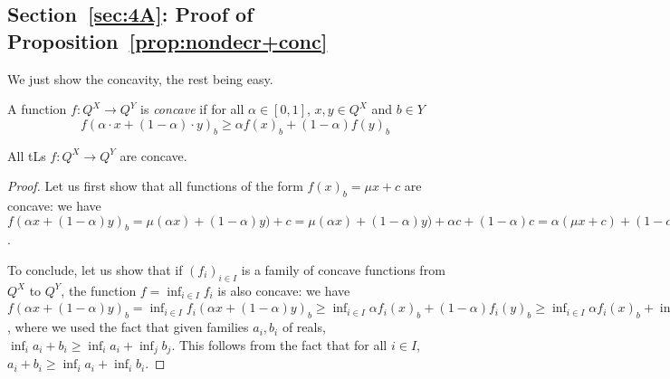\subsection{Section~\ref{sec:4A}: Proof of Proposition~\ref{prop:nondecr+conc}}

We just show the concavity, the rest being easy.

A function $f:Q^{X}\to Q^{Y}$ is \emph{concave} if for all $\alpha\in [0,1]$, $ x ,  y  \in Q^{X}$ and $b\in Y$ 
$$
f(\alpha\cdot  x +(1-\alpha)\cdot  y  )_{b} \geq \alpha f( x )_{b} + (1-\alpha)f( y  )_{b}
$$



\begin{proposition}
All tLs $f: Q^{X}\to Q^{Y}$ are concave.
\end{proposition}
\begin{proof}
Let us first show that all functions of the form $f( x )_{b}= \mu  x + c$ are concave:
we have $f(\alpha x + (1-\alpha) y  )_{b}= \mu(\alpha x )+(1-\alpha) y  )+c=
 \mu(\alpha x )+(1-\alpha) y  )+\alpha c+(1-\alpha)c=
 \alpha(\mu  x  + c)+(1-\alpha)(\mu  y  +c)=\alpha f( x )_{b}+(1-\alpha) f( x )_{b}$.


To conclude, let us show that if $(f_{i})_{i\in I}$ is a family of concave functions from $Q^{X}$ to $Q^{Y}$, the function $f=\inf_{i\in I}f_{i}$ is also concave: we have
$f(\alpha x  +(1-\alpha) y  )_{b}=
\inf_{i\in I}f_{i}(\alpha x +(1-\alpha) y  )_{b} \geq 
\inf_{i\in I}\alpha f_{i}( x )_{b}+(1-\alpha)f_{i}( y  )_{b}
\geq 
\inf_{i\in I}\alpha f_{i}( x )_{b} + \inf_{j\in I}(1-\alpha)f_{j}( y  )_{b}
=
\alpha \cdot (\inf_{i\in I}f_{i}( x )_{b})+ (1-\alpha)\cdot( \inf_{j\in I}f_{j}( y  )_{b})=
\alpha  f( x )_{b}+(1-\alpha)f( y  )_{b}$, where we used the fact that given families $a_{i},b_{i}$ of reals,
$\inf_{i}a_{i}+b_{i}\geq \inf_{i}a_{i}+\inf_{j}b_{j}$.
This follows from the fact that for all $i\in I$, $a_{i}+b_{i}\geq \inf_{i}a_{i}+\inf_{i}b_{i}$.
\end{proof}

